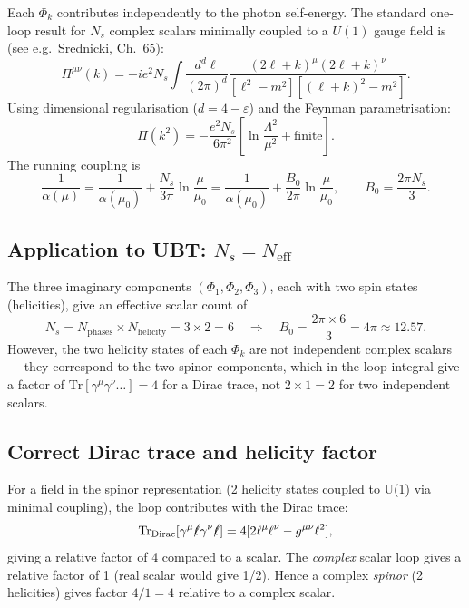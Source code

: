 \documentclass[12pt,a4paper]{article}
\theoremstyle{definition}
\theoremstyle{remark}
\newcommand{\Neff}{N_{\mathrm{eff}}}
\newcommand{\Tr}{\mathrm{Tr}}
\begin{document}
Each $\Phi_k$ contributes independently to the photon self-energy.  The
standard one-loop result for $N_s$ complex scalars minimally coupled to a
$U(1)$ gauge field is (see e.g.\ Srednicki, Ch.~65):
\begin{equation}
  \Pi^{\mu\nu}(k)
  = -ie^2 N_s \int \frac{d^d\ell}{(2\pi)^d}
  \frac{(2\ell+k)^\mu(2\ell+k)^\nu}{[\ell^2-m^2][(\ell+k)^2-m^2]}.
  \label{eq:Pi_munu}
\end{equation}
Using dimensional regularisation ($d = 4-\varepsilon$) and the Feynman
parametrisation:
\begin{equation}
  \Pi(k^2) = -\frac{e^2 N_s}{6\pi^2}
  \left[\ln\frac{\Lambda^2}{\mu^2} + \text{finite}\right].
  \label{eq:Pi_dim_reg}
\end{equation}
The running coupling is
\begin{equation}
  \frac{1}{\alpha(\mu)}
  = \frac{1}{\alpha(\mu_0)} + \frac{N_s}{3\pi}\ln\frac{\mu}{\mu_0}
  = \frac{1}{\alpha(\mu_0)} + \frac{B_0}{2\pi}\ln\frac{\mu}{\mu_0},
  \qquad
  B_0 = \frac{2\pi N_s}{3}.
  \label{eq:running_Ns}
\end{equation}

\subsection{Application to UBT: $N_s = \Neff$}

The three imaginary components $(\Phi_1, \Phi_2, \Phi_3)$, each with two
spin states (helicities), give an effective scalar count of
\begin{equation}
  N_s = N_\mathrm{phases} \times N_\mathrm{helicity} = 3 \times 2 = 6
  \quad\Rightarrow\quad
  B_0 = \frac{2\pi \times 6}{3} = 4\pi \approx 12.57.
  \label{eq:B0_intermediate}
\end{equation}
However, the two helicity states of each $\Phi_k$ are not independent complex
scalars --- they correspond to the two spinor components, which in the loop
integral give a factor of $\Tr[\gamma^\mu \gamma^\nu \ldots] = 4$ for a Dirac
trace, not $2 \times 1 = 2$ for two independent scalars.

\subsection{Correct Dirac trace and helicity factor}

For a field in the spinor representation (2 helicity states coupled to U(1)
via minimal coupling), the loop contributes with the Dirac trace:
\begin{equation}
  \Tr_\mathrm{Dirac}[\gamma^\mu \slashed{\ell}\gamma^\nu \slashed{\ell}]
  = 4[2\ell^\mu\ell^\nu - g^{\mu\nu}\ell^2],
  \label{eq:dirac_trace}
\end{equation}
giving a relative factor of 4 compared to a scalar.  The \emph{complex}
scalar loop gives a relative factor of 1 (real scalar would give 1/2).
Hence a complex \emph{spinor} (2 helicities) gives factor $4/1 = 4$ relative
to a complex scalar.
\end{document}
